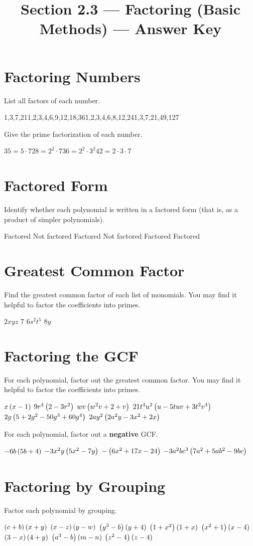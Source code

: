 

\title{Section 2.3 --- Factoring (Basic Methods) --- Answer Key}


\maketitle
\section*{Factoring Numbers}
List all factors of each number.
\begin{smenum}
\mitemxxxx
{1,3,7,21}{1,2,3,4,6,9,12,18,36}{1,2,3,4,6,8,12,24}{1,3,7,21,49,127}
\end{smenum}
Give the prime factorization of each number.
\begin{smenum}
\mitemxxxx
{$35=5\cdot 7$}{$28=2^2\cdot 7$}{$36=2^2\cdot 3^2$}{$42=2\cdot 3\cdot 7$}
\end{smenum}

\section*{Factored Form}
Identify whether each polynomial is written in a factored form (that is, as a product of simpler polynomials).
\begin{smenum}
\mitemxxx
{Factored}
{Not factored}
{Factored}
\mitemxxx
{Not factored}
{Factored}
{Factored}
\end{smenum}

\section*{Greatest Common Factor}
Find the greatest common factor of each list of monomials.  You may find it helpful to factor the coefficients into primes.
\begin{smenum}
\mitemxxxx
{$2xyz$}
{$7$}
{$6s^2t^5$}
{$8y$}
\end{smenum}

\section*{Factoring the GCF}
For each polynomial, factor out the greatest common factor.  You may find it helpful to factor the coefficients into primes.
\begin{smenum}
\mitemxx
{$x\left(x-1\right)$}
{$9r^4\left(2-3r^2\right)$}
\mitemxx
{$wv\left(w^2v+2+v\right)$}
{$21t^4u^2\left(u-5tuv+3t^2v^4\right)$}
\mitemxx
{$2g\left(5+2g^2-50g^3+60g^4\right)$}
{$2ay^2\left(2a^2y-3x^2+2x\right)$}
\end{smenum}
For each polynomial, factor out a \textbf{negative} GCF.
\begin{smenum}
\mitemxx
{$-6b\left(5b+4\right)$}
{$-3x^2y\left(5x^2-7y\right)$}
\mitemxx
{$-\left(6x^2+17x-24\right)$}
{$-3a^2bc^3\left(7a^2+5ab^2-9bc\right)$}
\end{smenum}

\section*{Factoring by Grouping}
Factor each polynomial by grouping.
\begin{smenum}
\mitemxxxx
{$\left(c+b\right)\left(x+y\right)$}
{$\left(x-z\right)\left(y-w\right)$}
{$\left(y^3-b\right)\left(y+4\right)$}
{$\left(1+x^2\right)\left(1+x\right)$}
\mitemxxxx
{$\left(x^2+1\right)\left(x-4\right)$}
{$\left(3-x\right)\left(4+y\right)$}
{$\left(a^3-b\right)\left(m-n\right)$}
{$\left(z^2-4\right)\left(z-4\right)$}
\end{smenum}

